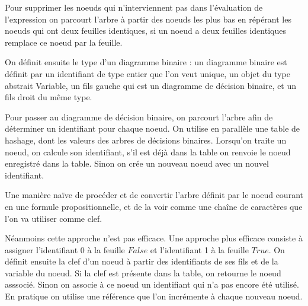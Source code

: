 \documentclass[11pt]{article}
\begin{document}
Pour supprimer les noeuds qui n'interviennent pas dans l'évaluation de l'expression on parcourt l'arbre à partir des noeuds les plus bas en répérant les noeuds qui ont deux feuilles identiques, si un noeud a deux feuilles identiques remplace ce noeud par la feuille.

On définit ensuite le type d'un diagramme binaire : un diagramme binaire est définit par un identifiant de type entier que l'on veut unique, un objet du type abstrait Variable, un fils gauche qui est un diagramme de décision binaire, et un fils droit du même type.  

Pour passer au diagramme de décision binaire, on parcourt l'arbre afin de déterminer un identifiant pour chaque noeud. On utilise en parallèle une table de hashage, dont les valeurs des arbres de décisions binaires. Lorsqu'on traite un noeud, on calcule son identifiant, s'il est déjà dans la table on renvoie le noeud enregistré dans la table. Sinon on crée un nouveau noeud avec un nouvel identifiant.

Une manière naïve de procéder et de convertir l'arbre définit par le noeud courant en une formule propositionnelle, et de la voir comme une chaîne de caractères que l'on va utiliser comme clef.

Néanmoins cette approche n'est pas efficace. Une approche plus efficace consiste à assigner l'identifiant $0$ à la feuille $False$ et l'identifiant 1 à la feuille $True$. On définit ensuite la clef d'un noeud à partir des identifiants de ses fils et de la variable du noeud. Si la clef est présente dans la table, on retourne le noeud asssocié. Sinon on associe à ce noeud un identifiant qui n'a pas encore été utilisé. En pratique on utilise une référence que l'on incrémente à chaque nouveau noeud. 
\end{document}
